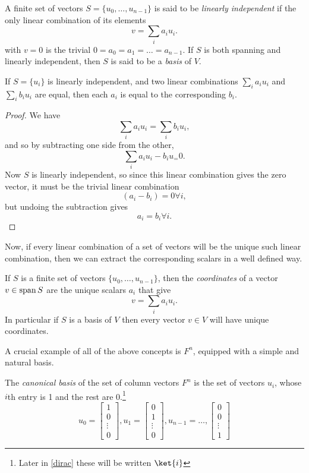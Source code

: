 \begin{define}
A finite set of vectors $S = \{u_0, \dots, u_{n-1}\}$ is said to be \emph{linearly independent} if the only linear combination of its elements
\[v = \sum_i a_i u_i.\]
with $v = 0$ is the trivial $0 = a_0 = a_1 = \dots = a_{n-1}$. If $S$ is both spanning and linearly independent, then $S$ is said to be a \emph{basis} of $V$.
\end{define}

\begin{prop}
	If $S = \{u_i\}$ is linearly independent, and two linear combinations $\sum_i a_iu_i$ and $\sum_i b_iu_i$ are equal, then each $a_i$ is equal to the corresponding $b_i$.
\end{prop}
\begin{proof}
	We have
	\[\sum_i a_iu_i = \sum_i b_iu_i,\]
	and so by subtracting one side from the other,
	\[\sum_i a_iu_i-b_iu_ = 0.\]
	Now $S$ is linearly independent, so since this linear combination gives the zero vector, it must be the trivial linear combination
	\[(a_i - b_i) = 0 \forall i,\]
	but undoing the subtraction gives
	\[a_i = b_i \forall i.\]
\end{proof}

Now, if every linear combination of a set of vectors will be the unique such linear combination, then we can extract the corresponding scalars in a well defined way.

\begin{define}
If $S$ is a finite set of vectors $\{u_0, \dots, u_{n-1}\}$, then the \emph{coordinates} of a vector $v \in \operatorname{span} S$ are the unique scalars $a_i$ that give
\[v = \sum_i a_i u_i.\]
In particular if $S$ is a basis of $V$ then every vector $v \in V$ will have unique coordinates.
\end{define}

A crucial example of all of the above concepts is $F^n$, equipped with a simple and natural basis.
\begin{define}\label{canonical-basis}
	The \emph{canonical basis} of the set of column vectors $F^n$ is the set of vectors $u_i$, whose $i$th entry is 1 and the rest are 0.\footnote{Later in \autoref{dirac} these will be written $\ket{i}$}
	\[u_0 = \begin{bmatrix}
		1 \\ 0 \\ \vdots \\ 0
	\end{bmatrix}, u_1 = \begin{bmatrix}
		0 \\ 1 \\ \vdots \\ 0
	\end{bmatrix}, u_{n-1} = \dots, \begin{bmatrix}
		0 \\ 0 \\ \vdots \\ 1
	\end{bmatrix}\]
\end{define}

